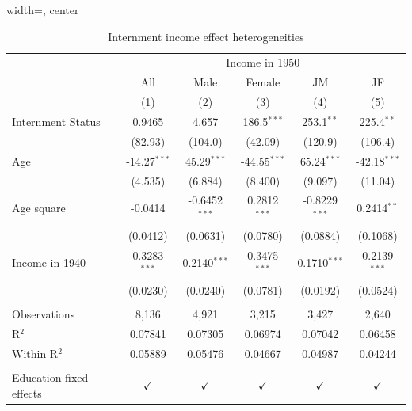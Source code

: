 \begin{table}[htbp]
   \caption{\label{tbl:reghet} Internment income effect heterogeneities}
   \begin{adjustbox}{width=\textwidth, center}
   \begin{tabular}{lccccc}
      \toprule
       & \multicolumn{5}{c}{Income in 1950}\\
                              & All            & Male            & Female         & JM              & JF \\   
                              & (1)            & (2)             & (3)            & (4)             & (5)\\  
      \midrule 
      Internment Status       & 0.9465         & 4.657           & 186.5$^{***}$  & 253.1$^{**}$    & 225.4$^{**}$\\   
                              & (82.93)        & (104.0)         & (42.09)        & (120.9)         & (106.4)\\   
      Age                     & -14.27$^{***}$ & 45.29$^{***}$   & -44.55$^{***}$ & 65.24$^{***}$   & -42.18$^{***}$\\   
                              & (4.535)        & (6.884)         & (8.400)        & (9.097)         & (11.04)\\   
      Age square              & -0.0414        & -0.6452$^{***}$ & 0.2812$^{***}$ & -0.8229$^{***}$ & 0.2414$^{**}$\\   
                              & (0.0412)       & (0.0631)        & (0.0780)       & (0.0884)        & (0.1068)\\   
      Income in 1940          & 0.3283$^{***}$ & 0.2140$^{***}$  & 0.3475$^{***}$ & 0.1710$^{***}$  & 0.2139$^{***}$\\   
                              & (0.0230)       & (0.0240)        & (0.0781)       & (0.0192)        & (0.0524)\\   
       \\
      Observations            & 8,136          & 4,921           & 3,215          & 3,427           & 2,640\\  
      R$^2$                   & 0.07841        & 0.07305         & 0.06974        & 0.07042         & 0.06458\\  
      Within R$^2$            & 0.05889        & 0.05476         & 0.04667        & 0.04987         & 0.04244\\  
       \\
      Education fixed effects & $\checkmark$   & $\checkmark$    & $\checkmark$   & $\checkmark$    & $\checkmark$\\   
      \bottomrule
   \end{tabular}
   \end{adjustbox}
   

\end{table}
